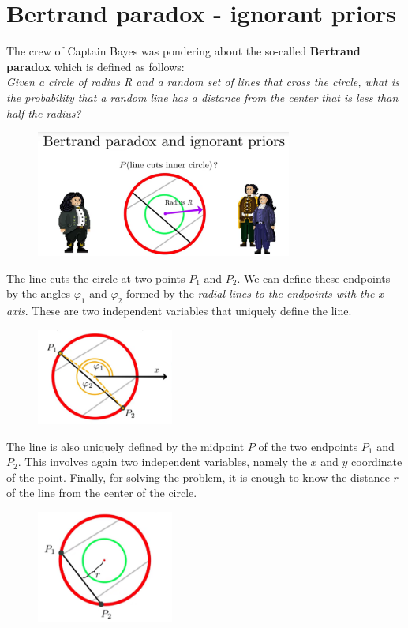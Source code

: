 \documentclass[12pt, a4paper]{scrartcl}
\begin{document}
\section*{Bertrand paradox - ignorant priors}
The crew of Captain Bayes was pondering about the so-called \textbf{Bertrand paradox} which is defined as follows:\\
\textit{Given a circle of radius R and a random set of lines that cross the circle,
what is the probability that a random line has a distance from the center that is less than half the radius?}\\%
 \begin{figure}[H]
	\centering
	\includegraphics[width=0.75\textwidth]{8_3.png}
\end{figure}

The line cuts the circle at two points $P_1$ and $P_2$.
We can define these endpoints by the angles $\varphi_1$ and $\varphi_2$ formed by the \textit{radial lines to the endpoints with the x-axis}. These are two independent variables that uniquely define the line.\\%
 \begin{figure}[H]
	\centering
	\includegraphics[width=0.4\textwidth]{8_4.png}
\end{figure}

The line is also uniquely defined by the midpoint $P$ of the two endpoints $P_1$ and $P_2$. 
This involves again two
independent variables, namely the $x$ and $y$ coordinate of the point. Finally, for solving the problem, it is enough to know the distance $r$ of the line from the center of the circle. \\%
 \begin{figure}[H]
	\centering
	\includegraphics[width=0.4\textwidth]{8_5.png}
\end{figure}
\end{document}
